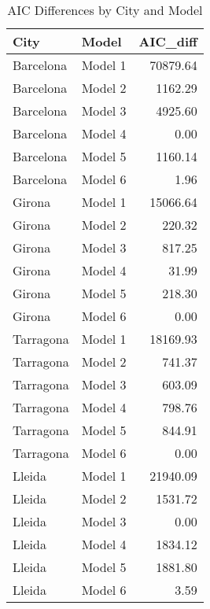 \begin{table}[ht]
\centering
\begin{tabular}{llr}
  \hline
City & Model & AIC\_diff \\ 
  \hline
Barcelona & Model 1 & 70879.64 \\ 
  Barcelona & Model 2 & 1162.29 \\ 
  Barcelona & Model 3 & 4925.60 \\ 
  Barcelona & Model 4 & 0.00 \\ 
  Barcelona & Model 5 & 1160.14 \\ 
  Barcelona & Model 6 & 1.96 \\ 
  Girona & Model 1 & 15066.64 \\ 
  Girona & Model 2 & 220.32 \\ 
  Girona & Model 3 & 817.25 \\ 
  Girona & Model 4 & 31.99 \\ 
  Girona & Model 5 & 218.30 \\ 
  Girona & Model 6 & 0.00 \\ 
  Tarragona & Model 1 & 18169.93 \\ 
  Tarragona & Model 2 & 741.37 \\ 
  Tarragona & Model 3 & 603.09 \\ 
  Tarragona & Model 4 & 798.76 \\ 
  Tarragona & Model 5 & 844.91 \\ 
  Tarragona & Model 6 & 0.00 \\ 
  Lleida & Model 1 & 21940.09 \\ 
  Lleida & Model 2 & 1531.72 \\ 
  Lleida & Model 3 & 0.00 \\ 
  Lleida & Model 4 & 1834.12 \\ 
  Lleida & Model 5 & 1881.80 \\ 
  Lleida & Model 6 & 3.59 \\ 
   \hline
\end{tabular}
\caption{AIC Differences by City and Model} 
\end{table}
